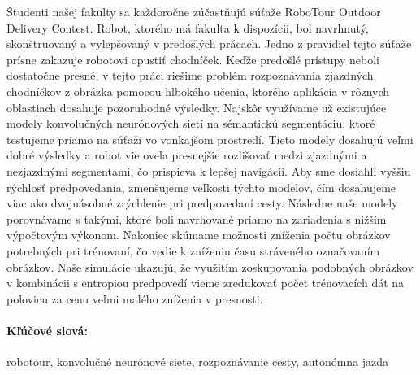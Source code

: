 \documentclass[12pt, oneside]{book}  %
\begin{document}
Študenti našej fakulty sa každoročne zúčastňujú súťaže RoboTour Outdoor Delivery Contest.
Robot, ktorého má fakulta k dispozícii, bol navrhnutý, skonštruovaný a
vylepšovaný v predošlých prácach. Jedno z pravidiel tejto súťaže prísne zakazuje
robotovi opustiť chodníček.
Keďže predošlé prístupy neboli dostatočne presné, v tejto práci riešime
problém rozpoznávania zjazdných chodníčkov z obrázka pomocou hlbokého učenia,
ktorého aplikácia v rôznych oblastiach dosahuje pozoruhodné výsledky.
Najskôr využívame už existujúce modely konvolučných neurónových sietí na sémantickú
segmentáciu, ktoré testujeme priamo na súťaži vo vonkajšom prostredí. Tieto modely
dosahujú veľmi dobré výsledky a robot vie oveľa presnejšie rozlišovať medzi zjazdnými
a nezjazdnými segmentami, čo prispieva k lepšej navigácii.
Aby sme dosiahli vyššiu rýchlosť predpovedania, zmenšujeme veľkosti týchto modelov,
čím dosahujeme viac ako dvojnásobné zrýchlenie pri predpovedaní cesty. Následne naše
modely porovnávame s takými, ktoré boli navrhované priamo na zariadenia s nižším výpočtovým
výkonom.
Nakoniec skúmame možnosti zníženia počtu obrázkov potrebných pri trénovaní,
čo vedie k zníženiu času stráveného označovaním obrázkov.
Naše simulácie ukazujú, že využitím zoskupovania podobných obrázkov
v kombinácii s entropiou predpovedí vieme zredukovať počet trénovacích dát na polovicu
za cenu veľmi malého zníženia v presnosti.

\paragraph*{Kľúčové slová:} robotour, konvolučné neurónové siete, rozpoznávanie cesty, autonómna jazda



\newpage 

\tableofcontents



\newpage 

\listoffigures
\listoftables


\mainmatter


 




\end{document}

